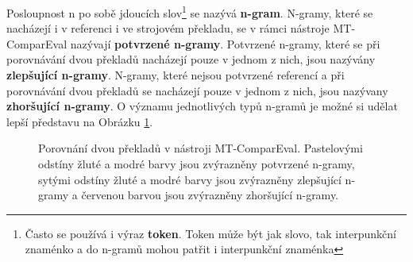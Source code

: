 Posloupnost n po sobě jdoucích slov\footnote{
  Často se používá i výraz \textbf{token}. Token může být jak slovo, tak interpunkční znaménko a do n-gramů mohou patřit i interpunkční znaménka}
  se nazývá \textbf{n-gram}.
N-gramy,
  které se nacházejí i v referenci i ve strojovém překladu,
  se v rámci nástroje MT-ComparEval nazývají \textbf{potvrzené n-gramy}.
Potvrzené n-gramy,
  které se při porovnávání dvou překladů nacházejí pouze v jednom z nich,
  jsou nazývány \textbf{zlepšující n-gramy}.
N-gramy,
  které nejsou potvrzené referencí
  a při porovnávání dvou překladů se nacházejí pouze v jednom z nich,
  jsou nazývany \textbf{zhoršující n-gramy}.
O významu jednotlivých typů n-gramů je možné si udělat lepší představu na Obrázku \ref{img:n-grams}.

\begin{figure}

	\caption{
		Porovnání dvou překladů v nástroji MT-ComparEval.
		Pastelovými odstíny žluté a modré barvy jsou zvýrazněny potvrzené n-gramy,
		sytými odstíny žluté a modré barvy jsou zvýrazněny zlepšující n-gramy
		a červenou barvou jsou zvýrazněny zhoršující n-gramy.
	}
	\label{img:n-grams}
\end{figure}

